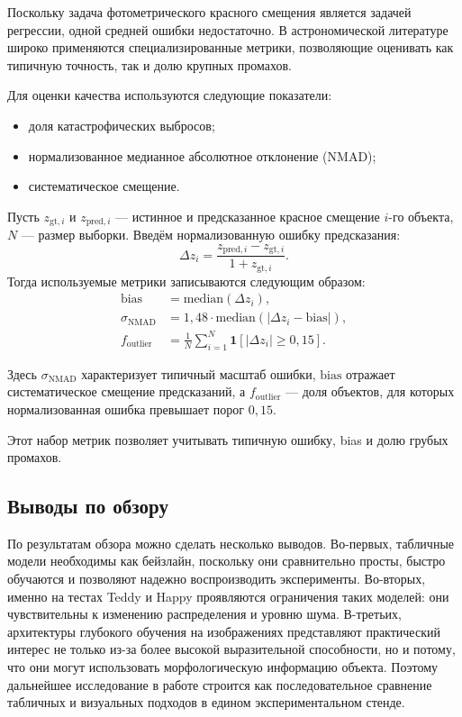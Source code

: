\documentclass[12pt,a4paper]{article}
\begin{document}
Поскольку задача фотометрического красного смещения является задачей регрессии, одной средней ошибки недостаточно. В астрономической литературе широко применяются специализированные метрики, позволяющие оценивать как типичную точность, так и долю крупных промахов.

Для оценки качества используются следующие показатели:
\begin{itemize}
    \item доля катастрофических выбросов;
    \item нормализованное медианное абсолютное отклонение (NMAD);
    \item систематическое смещение.
\end{itemize}

Пусть $z_{\mathrm{gt},i}$ и $z_{\mathrm{pred},i}$ — истинное и предсказанное красное смещение $i$-го объекта, $N$ — размер выборки. Введём нормализованную ошибку предсказания:
\[
\Delta z_i = \frac{z_{\mathrm{pred},i} - z_{\mathrm{gt},i}}{1 + z_{\mathrm{gt},i}}.
\]
Тогда используемые метрики записываются следующим образом:
\begin{align}
\mathrm{bias} &= \mathrm{median}(\Delta z_i), \\
\sigma_{\mathrm{NMAD}} &= 1{,}48 \cdot \mathrm{median}\!\left(|\Delta z_i - \mathrm{bias}|\right), \\
f_{\mathrm{outlier}} &= \frac{1}{N}\sum_{i=1}^{N} \mathbf{1}\!\left[|\Delta z_i| \ge 0{,}15\right].
\end{align}

Здесь $\sigma_{\mathrm{NMAD}}$ характеризует типичный масштаб ошибки, $\mathrm{bias}$ отражает систематическое смещение предсказаний, а $f_{\mathrm{outlier}}$ — доля объектов, для которых нормализованная ошибка превышает порог $0{,}15$.

Этот набор метрик позволяет учитывать типичную ошибку, bias и долю грубых промахов.

\subsection{Выводы по обзору}

По результатам обзора можно сделать несколько выводов. Во-первых, табличные модели необходимы как бейзлайн, поскольку они сравнительно просты, быстро обучаются и позволяют надежно воспроизводить эксперименты. Во-вторых, именно на тестах Teddy и Happy проявляются ограничения таких моделей: они чувствительны к изменению распределения и уровню шума. В-третьих, архитектуры глубокого обучения на изображениях представляют практический интерес не только из-за более высокой выразительной способности, но и потому, что они могут использовать морфологическую информацию объекта. Поэтому дальнейшее исследование в работе строится как последовательное сравнение табличных и визуальных подходов в едином экспериментальном стенде.
\end{document}
